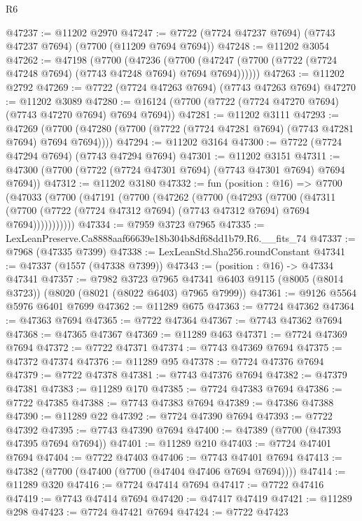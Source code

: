 \begin{lexlean}{R6}
\begin{coremodule}
@47237 := @11202 @2970
@47247 := @7722 (@7724 @47237 @7694) (@7743 @47237 @7694) (@7700 (@11209 @7694 @7694))
@47248 := @11202 @3054
@47262 := @47198
    (@7700
      (@47236
        (@7700 (@47247 (@7700 (@7722 (@7724 @47248 @7694) (@7743 @47248 @7694) @7694 @7694))))))
@47263 := @11202 @2792
@47269 := @7722 (@7724 @47263 @7694) (@7743 @47263 @7694)
@47270 := @11202 @3089
@47280 := @16124 (@7700 (@7722 (@7724 @47270 @7694) (@7743 @47270 @7694) @7694 @7694))
@47281 := @11202 @3111
@47293 := @47269
    (@7700 (@47280 (@7700 (@7722 (@7724 @47281 @7694) (@7743 @47281 @7694) @7694 @7694))))
@47294 := @11202 @3164
@47300 := @7722 (@7724 @47294 @7694) (@7743 @47294 @7694)
@47301 := @11202 @3151
@47311 := @47300 (@7700 (@7722 (@7724 @47301 @7694) (@7743 @47301 @7694) @7694 @7694))
@47312 := @11202 @3180
@47332 := fun (position : @16) =>
  @7700
    (@47033
      (@7700
        (@47191
          (@7700
            (@47262
              (@7700
                (@47293
                  (@7700
                    (@47311
                      (@7700 (@7722 (@7724 @47312 @7694) (@7743 @47312 @7694) @7694 @7694)))))))))))
@47334 := @7959 @3723 @7965
@47335 := LexLeanPreserve.Ca8888aaf66639e18b304b8df68dd1b79.R6.__fits_74
@47337 := @7968 (@47335 @7399)
@47338 := LexLeanStd.Sha256.roundConstant
@47341 := @47337 (@1557 (@47338 @7399))
@47343 := (position : @16) -> @47334 @47341
@47357 := @7982
    @3723
    @7965
    @47341
    @6403
    @9115
    (@8005 (@8014 @3723))
    (@8020 (@8021 (@8022 @6403) @7965 @7999))
@47361 := @9126 @5564 @5976 @6401 @7699
@47362 := @11289 @675
@47363 := @7724 @47362
@47364 := @47363 @7694
@47365 := @7722 @47364
@47367 := @7743 @47362 @7694
@47368 := @47365 @47367
@47369 := @11289 @463
@47371 := @7724 @47369 @7694
@47372 := @7722 @47371
@47374 := @7743 @47369 @7694
@47375 := @47372 @47374
@47376 := @11289 @95
@47378 := @7724 @47376 @7694
@47379 := @7722 @47378
@47381 := @7743 @47376 @7694
@47382 := @47379 @47381
@47383 := @11289 @170
@47385 := @7724 @47383 @7694
@47386 := @7722 @47385
@47388 := @7743 @47383 @7694
@47389 := @47386 @47388
@47390 := @11289 @22
@47392 := @7724 @47390 @7694
@47393 := @7722 @47392
@47395 := @7743 @47390 @7694
@47400 := @47389 (@7700 (@47393 @47395 @7694 @7694))
@47401 := @11289 @210
@47403 := @7724 @47401 @7694
@47404 := @7722 @47403
@47406 := @7743 @47401 @7694
@47413 := @47382 (@7700 (@47400 (@7700 (@47404 @47406 @7694 @7694))))
@47414 := @11289 @320
@47416 := @7724 @47414 @7694
@47417 := @7722 @47416
@47419 := @7743 @47414 @7694
@47420 := @47417 @47419
@47421 := @11289 @298
@47423 := @7724 @47421 @7694
@47424 := @7722 @47423

\end{coremodule}
\end{lexlean}
